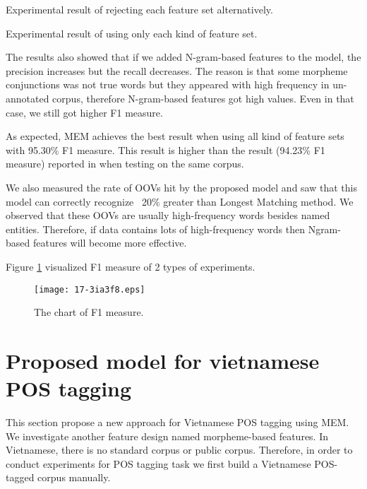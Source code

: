\documentclass[english]{jnlp_1.4}
\begin{document}
\begin{table}[b]
\caption{Experimental result of rejecting each feature set alternatively.}
\label{table 6}

\end{table}
\begin{table}[b]
\caption{Experimental result of using only each kind of feature set.}
\label{table 7}

\end{table}

The results also showed that if we added N-gram-based features to the model,
the precision increases but the recall decreases. The reason is that some morpheme conjunctions
was not true words but they appeared with high frequency in un-annotated corpus,
therefore N-gram-based features got high values. Even in that case, we still got higher F1 measure.

As expected, MEM achieves the best result when using all kind of feature sets with 95.30\% F1 measure.
This result is higher than the result (94.23\% F1 measure) reported in \cite{CamTu07} when testing on the same corpus.

We also measured the rate of OOVs hit by the proposed model and saw that this model can correctly
recognize ~20\% greater than Longest Matching method. We observed that these OOVs are
usually high-frequency words besides named entities. Therefore, if data contains lots of high-frequency words
then Ngram-based features will become more effective.

Figure \ref{firgure 4} visualized F1 measure of 2 types of experiments.

\begin{figure}[t]
\begin{center}
\texttt{[image: 17-3ia3f8.eps]}
\caption{The chart of F1 measure.}
\label{firgure 4}
\end{center}
\end{figure}



\section{Proposed model for vietnamese POS tagging}

This section propose a new approach for Vietnamese POS tagging using MEM.
We investigate another feature design named morpheme-based features.
In Vietnamese, there is no standard corpus or public corpus. Therefore, in order to conduct experiments for POS tagging
task we first build a Vietnamese POS-tagged corpus manually.
	
\end{document}
